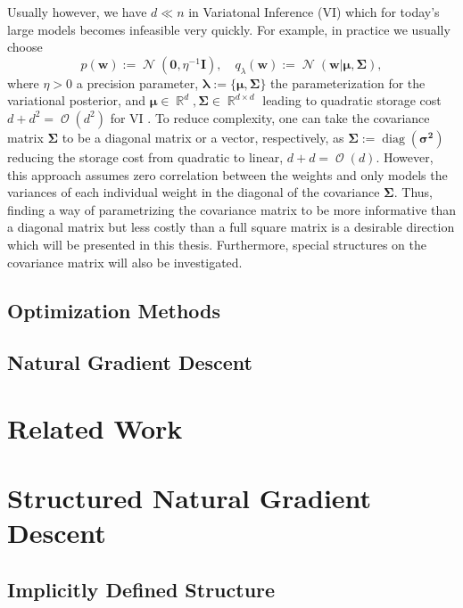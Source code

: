 \documentclass[a4paper, 11pt, oneside]{scrartcl}
\theoremstyle{break}
\DeclareMathOperator{\Normal}{\mathcal{N}}
\DeclareMathOperator{\Real}{\mathbb{R}}
\DeclareMathOperator{\diag}{diag}
\DeclareMathOperator{\BigO}{\mathcal{O}}
\newcommand{\matr}[1]{\boldsymbol{#1}}
\numberwithin{equation}{section}
\begin{document}
			Usually however, we have $d \ll n$ in Variatonal Inference (VI) which for today's large models becomes infeasible very quickly. 
			For example, in practice we usually choose 
			\begin{equation}
				p(\matr{w}) := \Normal(\matr{0}, \eta^{-1} \matr{I}), \quad q_{\lambda}(\matr{w}) := \Normal(\matr{w} | \matr{\mu}, \matr{\Sigma}),
				\label{eqn:VI_Normal}
			\end{equation}
			where $\eta > 0$ a precision parameter, $\matr{\lambda} := \{\matr{\mu}, \matr{\Sigma}\}$ the parameterization for the variational posterior, and $\matr{\mu} \in \Real^d, \matr{\Sigma} \in \Real^{d \times d}$ leading to quadratic storage cost $d + d^2 = \BigO(d^2)$ for VI \cite{ZSD+17, KNT+18, LSK20}.
			To reduce complexity, one can take the covariance matrix $\matr{\Sigma}$ to be a diagonal matrix or a vector, respectively, as $\matr{\Sigma} := \diag(\matr{\sigma^2})$ reducing the storage cost from quadratic to linear, $d + d = \BigO(d)$. 
			However, this approach assumes zero correlation between the weights and only models the variances of each individual weight in the diagonal of the covariance $\matr{\Sigma}$. 
			Thus, finding a way of parametrizing the covariance matrix to be more informative than a diagonal matrix but less costly than a full square matrix is a desirable direction which will be presented in this thesis. 
			Furthermore, special structures on the covariance matrix will also be investigated. 

		\subsection{Optimization Methods}

		\subsection{Natural Gradient Descent}

	\section{Related Work}

	\section{Structured Natural Gradient Descent}
		\subsection{Implicitly Defined Structure}
\end{document}
